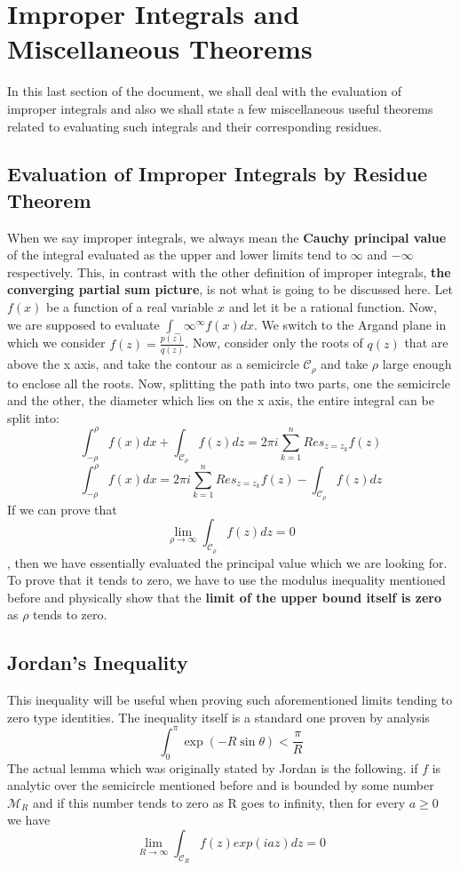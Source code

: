 \documentclass[11pt]{article}
\begin{document}
\begin{sloppypar}
\section{Improper Integrals and Miscellaneous Theorems}

In this last section of the document, we shall deal with the evaluation of improper integrals and also we shall state a few miscellaneous useful theorems related to evaluating such integrals and their corresponding residues. 

\subsection{Evaluation of Improper Integrals by Residue Theorem}
When we say improper integrals, we always mean the \textbf{Cauchy principal value} of the integral evaluated as the upper and lower limits tend to $\infty$ and $-\infty$ respectively. This, in contrast with the other definition of improper integrals, \textbf{the converging partial sum picture}, is not what is going to be discussed here. Let $f(x)$ be a function of a real variable $x$ and let it be a rational function. Now, we are supposed to evaluate $\int_-\infty^{\infty} f(x)dx$. We switch to the Argand plane in which we consider $f(z) = \frac{p(z)}{q(z)}$. Now, consider only the roots of $q(z)$ that are above the x axis, and take the contour as a semicircle $\mathcal{C}_\rho$ and take $\rho$ large enough to enclose all the roots. Now, splitting the path into two parts, one the semicircle and the other, the diameter which lies on the x axis, the entire integral can be split into:
$$\int_{-\rho}^{\rho}f(x)dx + \int_{\mathcal{C}_{\rho}}f(z)dz  = 2\pi i\sum_{k=1}^{n}Res_{z=z_{k}}f(z)$$
$$\int_{-\rho}^{\rho}f(x)dx   = 2\pi i\sum_{k=1}^{n}Res_{z=z_{k}}f(z) -  \int_{\mathcal{C}_{\rho}}f(z)dz$$
If we can prove that $$\lim_{\rho\to\infty}\int_{\mathcal{C}_{\rho}}f(z)dz = 0$$, then we have essentially evaluated the principal value which we are looking for. To prove that it tends to zero, we have to use the modulus inequality mentioned before and physically show that the \textbf{limit of the upper bound itself is zero} as $\rho$ tends to zero.

\subsection{Jordan\rq{}s Inequality}
This inequality will be useful when proving such aforementioned limits tending to zero type identities. The inequality itself is a standard one proven by analysis 
$$\int_{0}^{\pi} \exp(-R\sin\theta) < \frac{\pi}{R}$$ The actual lemma which was originally stated by Jordan is the following. if $f$ is analytic over the semicircle mentioned before and is bounded by some number $\mathcal{M}_{R}$ and if this number tends to zero as R goes to infinity, then for every $a\geq 0$ we have 
$$\lim_{R \to \infty} \int_{\mathcal{C}_{R}} f(z)exp(iaz)dz = 0$$


\end{sloppypar}
\end{document}

